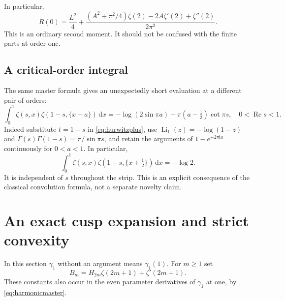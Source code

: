 \documentclass[11pt]{article}
\numberwithin{equation}{section}
\theoremstyle{definition}\newtheorem{definition}[theorem]{Definition}
\theoremstyle{remark}\newtheorem{remark}[theorem]{Remark}
\DeclareMathOperator{\Li}{Li}
\DeclareMathOperator{\Rea}{Re}
\newcommand{\dd}{\,\mathrm d}
\newcommand{\iu}{\mathrm i}
\begin{document}
In particular,
\begin{equation}\label{eq:Rzero}
 R(0)=\frac{L^2}{4}+
 \frac{(A^2+\pi^2/4)\zeta(2)-2A\zeta'(2)+\zeta''(2)}{2\pi^2}.
\end{equation}
This is an ordinary second moment. It should not be confused with the
finite parts at order one.

\subsection{A critical-order integral}

The same master formula gives an unexpectedly short evaluation at a
different pair of orders:
\begin{equation}\label{eq:critical}
 \int_0^1\zeta(s,x)\zeta(1-s,\{x+a\})\dd x
 =-\log(2\sin\pi a)+\pi(a-\tfrac12)\cot\pi s,
 \quad 0<\Rea s<1.
\end{equation}
Indeed substitute $t=1-s$ in \eqref{eq:hurwitzplus}, use
$\Li_1(z)=-\log(1-z)$ and
$\Gamma(s)\Gamma(1-s)=\pi/\sin\pi s$, and retain the arguments of
$1-e^{\pm2\pi\iu a}$ continuously for $0<a<1$. In particular,
\begin{equation}\label{eq:criticalhalf}
 \int_0^1\zeta(s,x)\zeta(1-s,\{x+\tfrac12\})\dd x=-\log2.
\end{equation}
It is independent of $s$ throughout the strip. This is an explicit
consequence of the classical convolution formula, not a separate
novelty claim.

\section{An exact cusp expansion and strict convexity}
\label{sec:cusp}

In this section $\gamma_1$ without an argument means $\gamma_1(1)$.
For $m\ge1$ set
\begin{equation}\label{eq:Bm}
 B_m=H_{2m}\zeta(2m+1)+\zeta'(2m+1).
\end{equation}
These constants also occur in the even parameter derivatives of
$\gamma_1$ at one, by \eqref{eq:harmonicmaster}.
\end{document}
